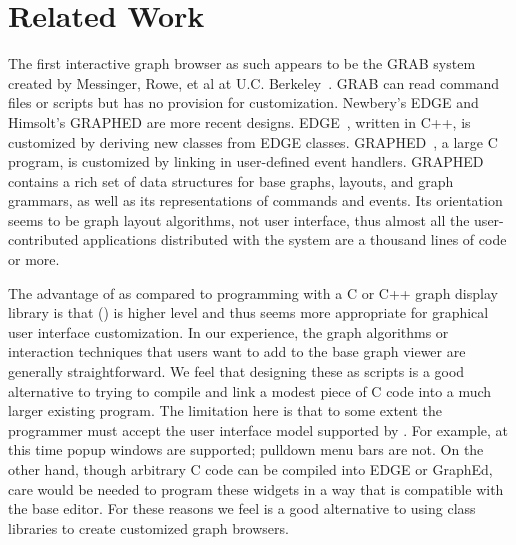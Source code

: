\chapter{Related Work}
The first interactive graph browser as such appears to be the GRAB system
created by Messinger, Rowe, et al at U.C. Berkeley~\cite{grab}.  GRAB can read
command files or scripts but has no provision for customization.  Newbery's
EDGE and Himsolt's GRAPHED are more recent designs.  EDGE~\cite{edge}, written
in C++, is customized by deriving new classes from EDGE classes.
GRAPHED~\cite{graphed}, a large C program, is customized by linking in
user-defined event handlers.  GRAPHED contains a rich set of data structures
for base graphs, layouts, and graph grammars, as well as its representations of
commands and events.  Its orientation seems to be graph layout algorithms, not
user interface, thus almost all the user-contributed applications distributed
with the system are a thousand lines of code or more.

The advantage of {\DOTTY} as compared to programming with a C or C++ graph
display library is that {\DOTTY} ({\LEFTY}) is higher level and thus seems more
appropriate for graphical user interface customization.  In our experience, the
graph algorithms or interaction techniques that users want to add to the base
graph viewer are generally straightforward.  We feel that designing these as
{\LEFTY} scripts is a good alternative to trying to compile and link a modest
piece of C code into a much larger existing program.  The limitation here is
that to some extent the programmer must accept the user interface model
supported by {\LEFTY}.  For example, at this time popup windows are supported;
pulldown menu bars are not.  On the other hand, though arbitrary C code can be
compiled into EDGE or GraphEd, care would be needed to program these widgets in
a way that is compatible with the base editor.  For these reasons we feel
{\DOTTY} is a good alternative to using class libraries to create customized
graph browsers.
